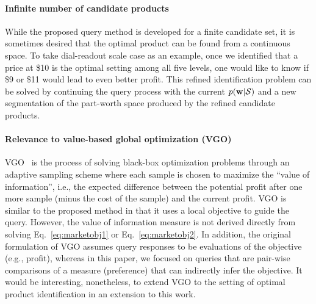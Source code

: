 \documentclass[onecolumn,11pt]{article}
\begin{document}
\paragraph{Infinite number of candidate products}
\label{subsec:infinite}
While the proposed query method is developed for a finite candidate set, it is sometimes desired that the optimal product can be found from a continuous space. To take dial-readout scale case as an example, once we identified that a price at \$10 is the optimal setting among all five levels, one would like to know if \$9 or \$11 would lead to even better profit. This refined identification problem can be solved by continuing the query process with the current $p({\bf w}|\mathcal{S})$ and a new segmentation of the part-worth space produced by the refined candidate products.  

\paragraph{Relevance to value-based global optimization (VGO)}
\label{subsec:vdd}
VGO~\cite{moore2014value} is the process of solving black-box optimization problems through an adaptive sampling scheme where each sample is chosen to maximize the ``value of information'', i.e., the expected difference between the potential profit after one more sample (minus the cost of the sample) and the current profit. VGO is similar to the proposed method in that it uses a local objective to guide the query. However, the value of information measure is not derived directly from solving Eq.~\eqref{eq:marketobj1} or Eq.~\eqref{eq:marketobj2}. In addition, the original formulation of VGO assumes query responses to be evaluations of the objective (e.g., profit), whereas in this paper, we focused on queries that are pair-wise comparisons of a measure (preference) that can indirectly infer the objective. It would be interesting, nonetheless, to extend VGO to the setting of optimal product identification in an extension to this work.

\end{document}
